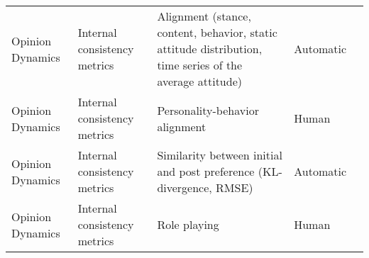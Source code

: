 \begin{small}
\begin{center}
\begin{longtable}{@{}p{}p{}p{}p{}p{}@{}}
Opinion Dynamics         & Internal consistency metrics        & Alignment (stance, content, behavior, static attitude distribution, time series of the average attitude)                                                                                                    & Automatic & \cite{Mou2024UnveilingTT}                                                                                                                                                                                                                                                                                                                                                                                               \\
Opinion Dynamics         & Internal consistency metrics        & Personality-behavior alignment                                                                                                                                                                              & Human     & \cite{Navarro2024DesigningRE}                                                                                                                                                                                                                                                                                                                                                                                                \\
Opinion Dynamics         & Internal consistency metrics        & Similarity between initial and post preference (KL-divergence, RMSE)                                                                                                                                        & Automatic & \cite{Namikoshi2024UsingLT}                                                                                                                                                                                                                                                                                                                                                                                                   \\
Opinion Dynamics         & Internal consistency metrics        & Role playing                                                                                                                                                                                                & Human     & \cite{lv2024coggpt}                                                                                                                                                                                                                                                                                                                                                                                              \\

\end{longtable}
\end{center}
\end{small}
